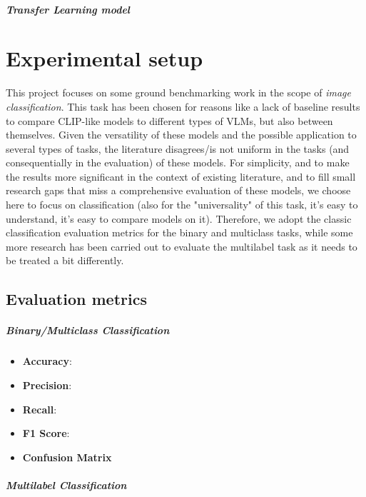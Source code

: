 \documentclass[a4paper, oneside, english]{sapthesis}
\begin{document}
\paragraph{Transfer Learning model}

\chapter{Experimental setup} %

This project focuses on some ground benchmarking work in the scope of \emph{image classification}. This task has been chosen for reasons like a lack of baseline results to compare CLIP-like models to different types of VLMs, but also between themselves. Given the versatility of these models and the possible application to several types of tasks, the literature disagrees/is not uniform in the tasks (and consequentially in the evaluation) of these models. For simplicity, and to make the results more significant in the context of existing literature, and to fill small research gaps that miss a comprehensive evaluation of these models, we choose here to focus on classification (also for the "universality" of this task, it's easy to understand, it's easy to compare models on it). Therefore, we adopt the classic classification evaluation metrics for the binary and multiclass tasks, while some more research has been carried out to evaluate the multilabel task as it needs to be treated a bit differently.

\section{Evaluation metrics}

\paragraph{Binary/Multiclass Classification}

\begin{itemize}
    \item \textbf{Accuracy}:
    \item \textbf{Precision}:
    \item \textbf{Recall}:
    \item \textbf{F1 Score}:
    \item \textbf{Confusion Matrix}
\end{itemize}

\paragraph{Multilabel Classification}
\end{document}
